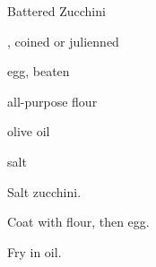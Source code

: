 \begin{recipe}{Battered Zucchini}{}{}

\begin{ingredients}
\item {}, coined or julienned
\item egg, beaten
\item all-purpose flour
\item olive oil
\item salt
\end{ingredients}

\begin{directions}
\item Salt zucchini.
\item Coat with flour, then egg.
\item Fry in oil.
\end{directions}

\end{recipe}
